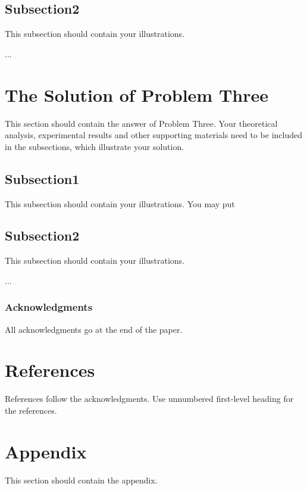\documentclass{article}
\begin{document}
\subsection{Subsection2}

This subsection should contain your illustrations.

...


\section{The Solution of Problem Three}


This section should contain the answer of Problem Three.
Your theoretical analysis, experimental results and other supporting materials 
need to be included in the subsections, which illustrate your solution.

\subsection{Subsection1}

This subsection should contain your illustrations.
You may put 

\subsection{Subsection2}

This subsection should contain your illustrations.

...



\subsubsection*{Acknowledgments}

All acknowledgments go at the end of the paper. 


\section*{References}

References follow the acknowledgments. Use unnumbered first-level heading for
the references. 



\section*{Appendix}

This section should contain the appendix.
\end{document}
